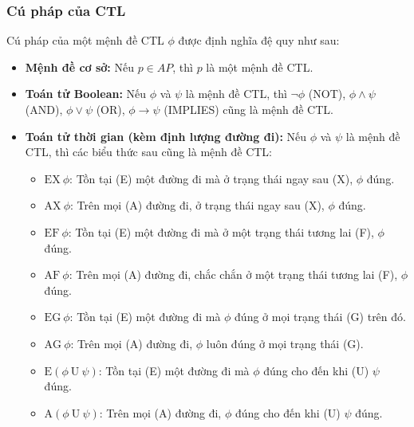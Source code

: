 \documentclass[12pt,a4paper]{article}
\begin{document}
\subsubsection{Cú pháp của CTL}
Cú pháp của một mệnh đề CTL $\phi$ được định nghĩa đệ quy như sau:
\begin{itemize}
    \item \textbf{Mệnh đề cơ sở:} Nếu $p \in AP$, thì $p$ là một mệnh đề CTL.
    \item \textbf{Toán tử Boolean:} Nếu $\phi$ và $\psi$ là mệnh đề CTL, thì $\neg \phi$ (NOT), $\phi \land \psi$ (AND), $\phi \lor \psi$ (OR), $\phi \rightarrow \psi$ (IMPLIES) cũng là mệnh đề CTL.
    \item \textbf{Toán tử thời gian (kèm định lượng đường đi):} Nếu $\phi$ và $\psi$ là mệnh đề CTL, thì các biểu thức sau cũng là mệnh đề CTL:
    \begin{itemize}
        \item $\text{EX} \ \phi$: Tồn tại (E) một đường đi mà ở trạng thái ngay sau (X), $\phi$ đúng.
        \item $\text{AX} \ \phi$: Trên mọi (A) đường đi, ở trạng thái ngay sau (X), $\phi$ đúng.
        \item $\text{EF} \ \phi$: Tồn tại (E) một đường đi mà ở một trạng thái tương lai (F), $\phi$ đúng.
        \item $\text{AF} \ \phi$: Trên mọi (A) đường đi, chắc chắn ở một trạng thái tương lai (F), $\phi$ đúng.
        \item $\text{EG} \ \phi$: Tồn tại (E) một đường đi mà $\phi$ đúng ở mọi trạng thái (G) trên đó.
        \item $\text{AG} \ \phi$: Trên mọi (A) đường đi, $\phi$ luôn đúng ở mọi trạng thái (G).
        \item $\text{E}(\phi \ \text{U} \ \psi)$: Tồn tại (E) một đường đi mà $\phi$ đúng cho đến khi (U) $\psi$ đúng.
        \item $\text{A}(\phi \ \text{U} \ \psi)$: Trên mọi (A) đường đi, $\phi$ đúng cho đến khi (U) $\psi$ đúng.
    \end{itemize}
\end{itemize}
\end{document}
